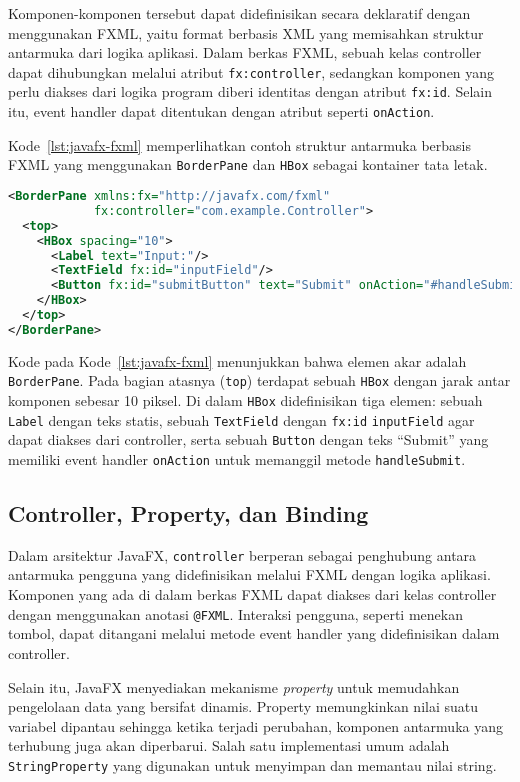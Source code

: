 Komponen-komponen tersebut dapat didefinisikan secara deklaratif dengan menggunakan FXML, yaitu format berbasis XML yang memisahkan struktur antarmuka dari logika aplikasi. Dalam berkas FXML, sebuah kelas controller dapat dihubungkan melalui atribut \texttt{fx:controller}, sedangkan komponen yang perlu diakses dari logika program diberi identitas dengan atribut \texttt{fx:id}. Selain itu, event handler dapat ditentukan dengan atribut seperti \texttt{onAction}.  

Kode~\ref{lst:javafx-fxml} memperlihatkan contoh struktur antarmuka berbasis FXML yang menggunakan \texttt{BorderPane} dan \texttt{HBox} sebagai kontainer tata letak.

\begin{lstlisting}[language=XML, caption=Contoh struktur antarmuka menggunakan FXML, label=lst:javafx-fxml]
<BorderPane xmlns:fx="http://javafx.com/fxml"
            fx:controller="com.example.Controller">
  <top>
    <HBox spacing="10">
      <Label text="Input:"/>
      <TextField fx:id="inputField"/>
      <Button fx:id="submitButton" text="Submit" onAction="#handleSubmit"/>
    </HBox>
  </top>
</BorderPane>
\end{lstlisting}

Kode pada Kode~\ref{lst:javafx-fxml} menunjukkan bahwa elemen akar adalah \texttt{BorderPane}. Pada bagian atasnya (\texttt{top}) terdapat sebuah \texttt{HBox} dengan jarak antar komponen sebesar 10 piksel. Di dalam \texttt{HBox} didefinisikan tiga elemen: sebuah \texttt{Label} dengan teks statis, sebuah \texttt{TextField} dengan \texttt{fx:id} \texttt{inputField} agar dapat diakses dari controller, serta sebuah \texttt{Button} dengan teks “Submit” yang memiliki event handler \texttt{onAction} untuk memanggil metode \texttt{handleSubmit}.


\subsection{Controller, Property, dan Binding}
Dalam arsitektur JavaFX, \texttt{controller} berperan sebagai penghubung antara antarmuka pengguna yang didefinisikan melalui FXML dengan logika aplikasi. Komponen yang ada di dalam berkas FXML dapat diakses dari kelas controller dengan menggunakan anotasi \texttt{@FXML}. Interaksi pengguna, seperti menekan tombol, dapat ditangani melalui metode event handler yang didefinisikan dalam controller.  

Selain itu, JavaFX menyediakan mekanisme \textit{property} untuk memudahkan pengelolaan data yang bersifat dinamis. Property memungkinkan nilai suatu variabel dipantau sehingga ketika terjadi perubahan, komponen antarmuka yang terhubung juga akan diperbarui. Salah satu implementasi umum adalah \texttt{StringProperty} yang digunakan untuk menyimpan dan memantau nilai string.  

